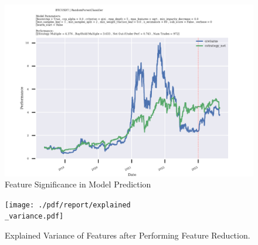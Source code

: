 \begin{figure}
\centering
\begin{adjustbox}{max width=1.3\textwidth,center}
\includegraphics[scale=1.3]{./pdf/report/backtest_res.pdf}
\end{adjustbox}
\caption{Feature Significance in Model Prediction}
\label{fig:backtest_res}
\end{figure}




\begin{figure}
\centering
\texttt{[image: ./pdf/report/explained\\\_variance.pdf]}
\caption{Explained Variance of Features after Performing Feature Reduction.}
\label{fig:explained_variance}
\end{figure}
